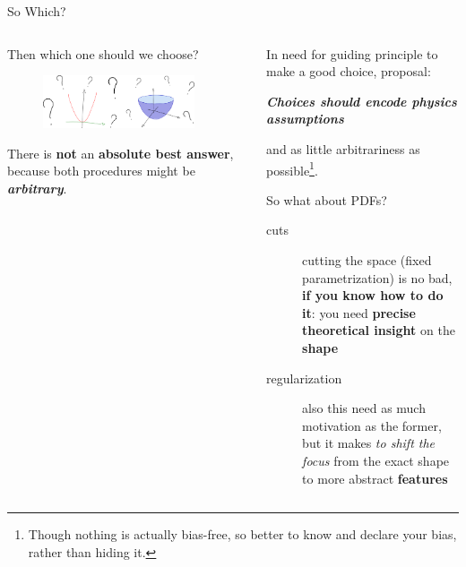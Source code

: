 \documentclass[9pt]{beamer}
\begin{document}
\begin{frame}{So Which?}
    \vspace*{15pt}
    \begin{columns}
        \begin{column}{0.5\textwidth}
            Then which one should we choose?
            \vspace*{10pt}

            \begin{figure}
                \centering
                \includegraphics[width=0.9\textwidth]{choice}
            \end{figure}

            \vspace*{10pt}
            There is \textbf{not} an \alert{\textbf{absolute best answer}},
            because both procedures might be \textit{\textbf{arbitrary}}.
        \end{column}
        \begin{column}{0.5\textwidth}
            In need for guiding principle to make a good choice, proposal:
            \vspace*{-2pt}
            \begin{center}
                \itshape
                \bfseries
                Choices should encode physics assumptions
            \end{center}
            \vspace*{-2pt}
            and as little arbitrariness as possible\footnote{
                Though nothing is actually bias-free, so better to know and
                declare your bias, rather than hiding it.
            }.

            \vspace*{15pt}
            So what about PDFs?
            \begin{description}
                \item[cuts] cutting the space (fixed parametrization) is no
                    bad, \textbf{if you know how to do it}: you need
                    \alert{\textbf{precise theoretical insight}} on the
                    \alert{\textbf{\pdf shape}}
                \item[regularization] also this need as much motivation as the
                    former, but it makes \textit{to shift the focus} from the
                    exact shape to more abstract \alert{\textbf{features}}
            \end{description}
            \vspace*{5pt}
        \end{column}
    \end{columns}
    \vspace*{10pt}


\end{frame}
\end{document}
